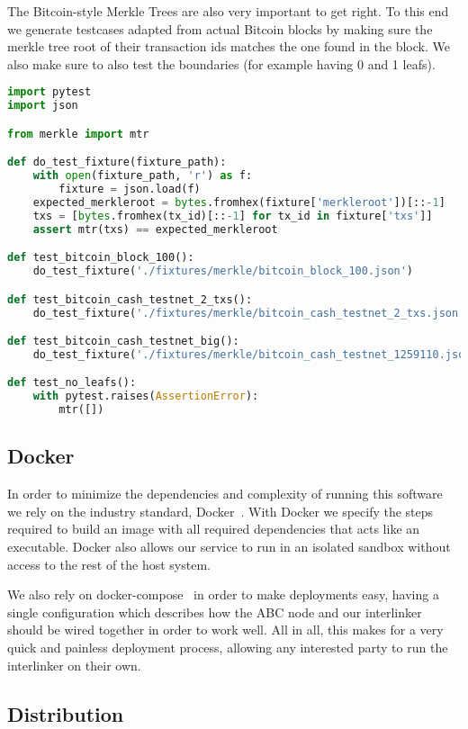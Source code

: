 The Bitcoin-style Merkle Trees are also very important to get right. To this end we generate testcases adapted from actual Bitcoin blocks by making sure the merkle tree root of their transaction ids matches the one found in the block. We also make sure to also test the boundaries (for example having 0 and 1 leafs).

\begin{lstlisting}[language=Python]
import pytest
import json

from merkle import mtr

def do_test_fixture(fixture_path):
    with open(fixture_path, 'r') as f:
        fixture = json.load(f)
    expected_merkleroot = bytes.fromhex(fixture['merkleroot'])[::-1]
    txs = [bytes.fromhex(tx_id)[::-1] for tx_id in fixture['txs']]
    assert mtr(txs) == expected_merkleroot

def test_bitcoin_block_100():
    do_test_fixture('./fixtures/merkle/bitcoin_block_100.json')

def test_bitcoin_cash_testnet_2_txs():
    do_test_fixture('./fixtures/merkle/bitcoin_cash_testnet_2_txs.json')

def test_bitcoin_cash_testnet_big():
    do_test_fixture('./fixtures/merkle/bitcoin_cash_testnet_1259110.json')

def test_no_leafs():
    with pytest.raises(AssertionError):
        mtr([])
\end{lstlisting}

\subsection{Docker}

In order to minimize the dependencies and complexity of running this software we rely on the industry standard, Docker~\cite{docker}. With Docker we specify the steps required to build an image with all required dependencies that acts like an executable. Docker also allows our service to run in an isolated sandbox without access to the rest of the host system.

We also rely on docker-compose~\cite{docker-compose} in order to make deployments easy, having a single configuration which describes how the ABC node and our interlinker should be wired together in order to work well. All in all, this makes for a very quick and painless deployment process, allowing any interested party to run the interlinker on their own.

\subsection{Distribution}

